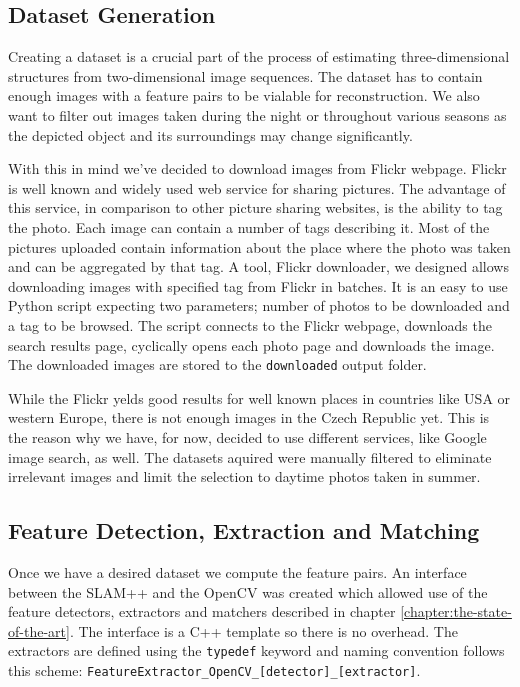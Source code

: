 \subsection*{Dataset Generation}
Creating a dataset is a crucial part of the process of estimating three-dimensional structures from two-dimensional image sequences. The dataset has to contain enough images with a feature pairs to be vialable for reconstruction. We also want to filter out images taken during the night or throughout various seasons as the depicted object and its surroundings may change significantly.

With this in mind we've decided to download images from Flickr webpage. Flickr is well known and widely used web service for sharing pictures. The advantage of this service, in comparison to other picture sharing websites, is the ability to tag the photo. Each image can contain a number of tags describing it. Most of the pictures uploaded contain information about the place where the photo was taken and can be aggregated by that tag. A tool, Flickr downloader, we designed allows downloading images with specified tag from Flickr in batches. It is an easy to use Python script expecting two parameters; number of photos to be downloaded and a tag to be browsed. The script connects to the Flickr webpage, downloads the search results page, cyclically opens each photo page and downloads the image. The downloaded images are stored to the \texttt{downloaded} output folder.

While the Flickr yelds good results for well known places in countries like USA or western Europe, there is not enough images in the Czech Republic yet. This is the reason why we have, for now, decided to use different services, like Google image search, as well. The datasets aquired were manually filtered to eliminate irrelevant images and limit the selection to daytime photos taken in summer.

\subsection*{Feature Detection, Extraction and Matching}
Once we have a desired dataset we compute the feature pairs. An interface between the SLAM++ and the OpenCV was created which allowed use of the feature detectors, extractors and matchers described in chapter \ref{chapter:the-state-of-the-art}. The interface is a C++ template so there is no overhead. The extractors are defined using the \texttt{typedef} keyword and naming convention follows this scheme: \texttt{FeatureExtractor\_OpenCV\_[detector]\_[extractor]}.

